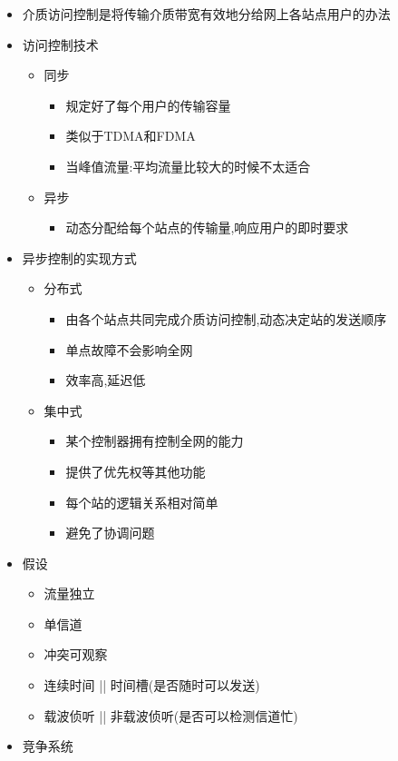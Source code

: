 \documentclass[a4paper,12pt,notitlepage]{article}
\begin{document}
\begin{itemize}
	\item 介质访问控制是将传输介质带宽有效地分给网上各站点用户的办法
	\item 访问控制技术
	\begin{itemize}
		\item 同步
		\begin{itemize}
			\item 规定好了每个用户的传输容量
			\item 类似于TDMA和FDMA
			\item 当峰值流量:平均流量比较大的时候不太适合
		\end{itemize}
		\item 异步
		\begin{itemize}
			\item 动态分配给每个站点的传输量,响应用户的即时要求
		\end{itemize}
	\end{itemize}
	\item 异步控制的实现方式
	\begin{itemize}
		\item 分布式
		\begin{itemize}
			\item 由各个站点共同完成介质访问控制,动态决定站的发送顺序
			\item 单点故障不会影响全网
			\item 效率高,延迟低
		\end{itemize}
		\item 集中式
		\begin{itemize}
			\item 某个控制器拥有控制全网的能力
			\item 提供了优先权等其他功能
			\item 每个站的逻辑关系相对简单
			\item 避免了协调问题
		\end{itemize}
	\end{itemize}
	\item 假设
	\begin{itemize}
		\item 流量独立
		\item 单信道
		\item 冲突可观察
		\item 连续时间 || 时间槽(是否随时可以发送)
		\item 载波侦听 || 非载波侦听(是否可以检测信道忙)
	\end{itemize}
	\item 竞争系统
	\begin{itemize}

\end{itemize}
\end{itemize}
\end{document}
